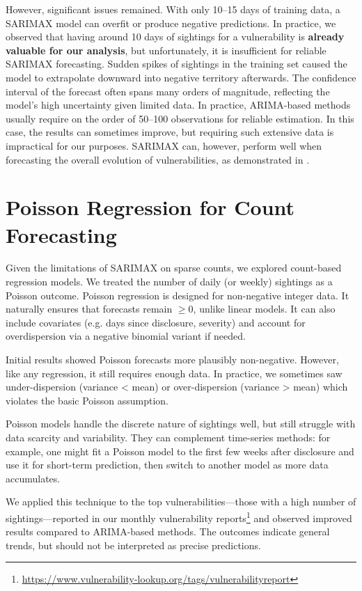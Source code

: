 \documentclass[]{article}
\begin{document}
However, significant issues remained. With only 10–15 days of training data, a SARIMAX model can overfit or produce negative predictions. In practice, we observed that having around 10 days of sightings for a vulnerability is \textbf{already valuable for our analysis}, but unfortunately, it is insufficient for reliable SARIMAX forecasting.
Sudden spikes of sightings in the training set caused the model to extrapolate downward into negative territory afterwards.
The confidence interval of the forecast often spans many orders of magnitude, reflecting the model's high uncertainty given limited data. In practice, ARIMA-based methods usually require on the order of 50–100 observations for reliable estimation.
In this case, the results can sometimes improve, but requiring such extensive data is impractical for our purposes. SARIMAX can, however, perform well when forecasting the overall evolution of vulnerabilities, as demonstrated in \cite{10.1145/3492328}.



\section{Poisson Regression for Count Forecasting}

Given the limitations of SARIMAX on sparse counts, we explored count-based regression models. We treated the number of daily (or weekly) sightings as a Poisson outcome.
Poisson regression is designed for non-negative integer data. It naturally ensures that forecasts remain $\geq 0$, unlike linear models. It can also include covariates (e.g. days since disclosure, severity) and account for overdispersion via a negative binomial variant if needed.

Initial results showed Poisson forecasts more plausibly non-negative. However, like any regression, it still requires enough data. In practice, we sometimes saw under-dispersion (variance < mean) or over-dispersion (variance > mean) which violates the basic Poisson assumption.

Poisson models handle the discrete nature of sightings well, but still struggle with data scarcity and variability. They can complement time-series methods: for example, one might fit a Poisson model to the first few weeks after disclosure and use it for short-term prediction, then switch to another model as more data accumulates.

We applied this technique to the top vulnerabilities—those with a high number of sightings—reported in our monthly vulnerability reports\footnote{\scriptsize \url{https://www.vulnerability-lookup.org/tags/vulnerabilityreport}}
and observed improved results compared to ARIMA-based methods. The outcomes indicate general trends, but should not be interpreted as precise predictions.
\end{document}
